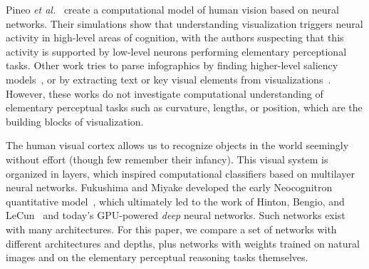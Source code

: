  Pineo \textit{et al.}~\cite{Pineo2012_computational_perception} create a computational model of human vision based on neural networks. Their simulations show that understanding visualization triggers neural activity in high-level areas of cognition, with the authors suspecting that this activity is supported by low-level neurons performing elementary perceptional tasks. Other work tries to parse infographics by finding higher-level saliency models~\cite{bylinskii2016should}, or by extracting text or key visual elements from visualizations~\cite{diagram_understanding,kembhavi2016diagram,zoya_text_visual_tags}. However, these works do not investigate computational understanding of elementary perceptual tasks such as curvature, lengths, or position, which are the building blocks of visualization.


 The human visual cortex allows us to recognize objects in the world seemingly without effort (though few remember their infancy). This visual system is organized in layers, which inspired computational classifiers based on multilayer neural networks. Fukushima and Miyake developed the early Neocognitron quantitative model~\cite{fukushima1982neocognitron}, which ultimately led to the work of Hinton, Bengio, and LeCun~\cite{lecun2015deep} and today's GPU-powered \emph{deep} neural networks. Such networks exist with many architectures. For this paper, we compare a set of networks with different architectures and depths, plus networks with weights trained on natural images and on the elementary perceptual reasoning tasks themselves.



